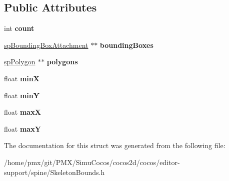 \subsection*{Public Attributes}
\begin{DoxyCompactItemize}
\item 
\mbox{\label{structspSkeletonBounds_acfc4bfcff1f1eb3040568743a8bbcb1e}} 
int {\bfseries count}
\item 
\mbox{\label{structspSkeletonBounds_a99a16f7b5f87b0638441da0454519612}} 
\hyperlink{structspBoundingBoxAttachment}{sp\+Bounding\+Box\+Attachment} $\ast$$\ast$ {\bfseries bounding\+Boxes}
\item 
\mbox{\label{structspSkeletonBounds_a28ab13af44264cb202ad655d44a85414}} 
\hyperlink{structspPolygon}{sp\+Polygon} $\ast$$\ast$ {\bfseries polygons}
\item 
\mbox{\label{structspSkeletonBounds_a338cf1b6b36cc1bcfd57a58f737ec721}} 
float {\bfseries minX}
\item 
\mbox{\label{structspSkeletonBounds_a05e868486294361984d02c831c006dab}} 
float {\bfseries minY}
\item 
\mbox{\label{structspSkeletonBounds_a13f11677ee3b611ccbde0a17ae9531f3}} 
float {\bfseries maxX}
\item 
\mbox{\label{structspSkeletonBounds_a5e7ead1a01b2dffc2f0162066c74dff5}} 
float {\bfseries maxY}
\end{DoxyCompactItemize}


The documentation for this struct was generated from the following file\+:\begin{DoxyCompactItemize}
\item 
/home/pmx/git/\+P\+M\+X/\+Simu\+Cocos/cocos2d/cocos/editor-\/support/spine/Skeleton\+Bounds.\+h\end{DoxyCompactItemize}
